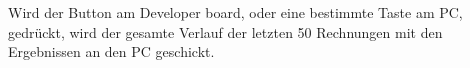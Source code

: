 Wird der Button am Developer board, oder eine bestimmte Taste am PC, gedrückt, wird der gesamte Verlauf der letzten 50 Rechnungen mit den Ergebnissen an den PC geschickt.